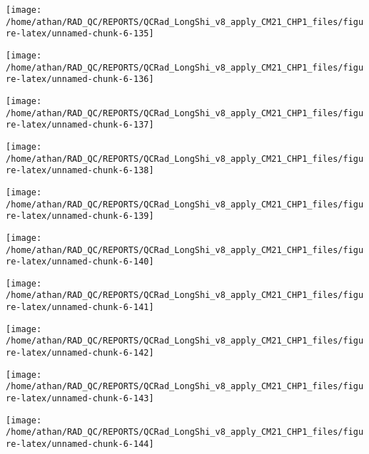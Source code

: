 \documentclass[
  10pt,
  a4paper,oneside]{article}
\begin{document}
\begin{center}\texttt{[image: /home/athan/RAD\_QC/REPORTS/QCRad\_LongShi\_v8\_apply\_CM21\_CHP1\_files/figure-latex/unnamed-chunk-6-135]} \end{center}

\begin{center}\texttt{[image: /home/athan/RAD\_QC/REPORTS/QCRad\_LongShi\_v8\_apply\_CM21\_CHP1\_files/figure-latex/unnamed-chunk-6-136]} \end{center}

\begin{center}\texttt{[image: /home/athan/RAD\_QC/REPORTS/QCRad\_LongShi\_v8\_apply\_CM21\_CHP1\_files/figure-latex/unnamed-chunk-6-137]} \end{center}

\begin{center}\texttt{[image: /home/athan/RAD\_QC/REPORTS/QCRad\_LongShi\_v8\_apply\_CM21\_CHP1\_files/figure-latex/unnamed-chunk-6-138]} \end{center}

\begin{center}\texttt{[image: /home/athan/RAD\_QC/REPORTS/QCRad\_LongShi\_v8\_apply\_CM21\_CHP1\_files/figure-latex/unnamed-chunk-6-139]} \end{center}

\begin{center}\texttt{[image: /home/athan/RAD\_QC/REPORTS/QCRad\_LongShi\_v8\_apply\_CM21\_CHP1\_files/figure-latex/unnamed-chunk-6-140]} \end{center}

\begin{center}\texttt{[image: /home/athan/RAD\_QC/REPORTS/QCRad\_LongShi\_v8\_apply\_CM21\_CHP1\_files/figure-latex/unnamed-chunk-6-141]} \end{center}

\begin{center}\texttt{[image: /home/athan/RAD\_QC/REPORTS/QCRad\_LongShi\_v8\_apply\_CM21\_CHP1\_files/figure-latex/unnamed-chunk-6-142]} \end{center}

\begin{center}\texttt{[image: /home/athan/RAD\_QC/REPORTS/QCRad\_LongShi\_v8\_apply\_CM21\_CHP1\_files/figure-latex/unnamed-chunk-6-143]} \end{center}

\begin{center}\texttt{[image: /home/athan/RAD\_QC/REPORTS/QCRad\_LongShi\_v8\_apply\_CM21\_CHP1\_files/figure-latex/unnamed-chunk-6-144]} \end{center}
\end{document}
